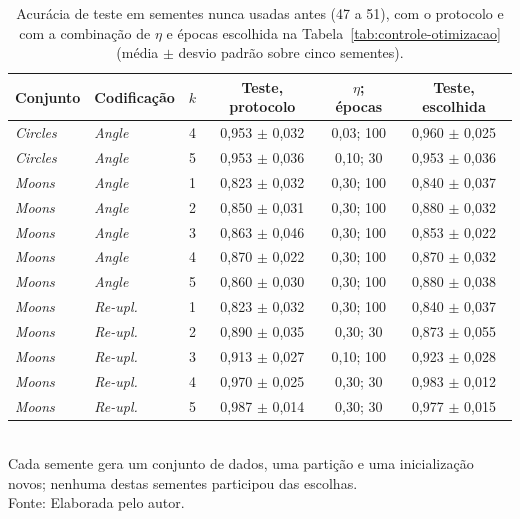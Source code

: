 \begin{table}[htb]
\centering
\small
\caption[Avaliação em sementes novas]{Acurácia de teste em sementes nunca usadas antes (47 a 51), com o protocolo e com a combinação de $\eta$ e épocas escolhida na Tabela~\ref{tab:controle-otimizacao} (média $\pm$ desvio padrão sobre cinco sementes).}
\label{tab:sementes-novas}
\begin{tabular}{llcccc}
\toprule
Conjunto & Codificação & $k$ & Teste, protocolo & $\eta$; épocas & Teste, escolhida \\
\midrule
\textit{Circles} & \textit{Angle} & 4 & 0,953 $\pm$ 0,032 & 0,03; 100 & 0,960 $\pm$ 0,025 \\
\textit{Circles} & \textit{Angle} & 5 & 0,953 $\pm$ 0,036 & 0,10; 30 & 0,953 $\pm$ 0,036 \\
\midrule
\textit{Moons} & \textit{Angle} & 1 & 0,823 $\pm$ 0,032 & 0,30; 100 & 0,840 $\pm$ 0,037 \\
\textit{Moons} & \textit{Angle} & 2 & 0,850 $\pm$ 0,031 & 0,30; 100 & 0,880 $\pm$ 0,032 \\
\textit{Moons} & \textit{Angle} & 3 & 0,863 $\pm$ 0,046 & 0,30; 100 & 0,853 $\pm$ 0,022 \\
\textit{Moons} & \textit{Angle} & 4 & 0,870 $\pm$ 0,022 & 0,30; 100 & 0,870 $\pm$ 0,032 \\
\textit{Moons} & \textit{Angle} & 5 & 0,860 $\pm$ 0,030 & 0,30; 100 & 0,880 $\pm$ 0,038 \\
\textit{Moons} & \textit{Re-upl.} & 1 & 0,823 $\pm$ 0,032 & 0,30; 100 & 0,840 $\pm$ 0,037 \\
\textit{Moons} & \textit{Re-upl.} & 2 & 0,890 $\pm$ 0,035 & 0,30; 30 & 0,873 $\pm$ 0,055 \\
\textit{Moons} & \textit{Re-upl.} & 3 & 0,913 $\pm$ 0,027 & 0,10; 100 & 0,923 $\pm$ 0,028 \\
\textit{Moons} & \textit{Re-upl.} & 4 & 0,970 $\pm$ 0,025 & 0,30; 30 & 0,983 $\pm$ 0,012 \\
\textit{Moons} & \textit{Re-upl.} & 5 & 0,987 $\pm$ 0,014 & 0,30; 30 & 0,977 $\pm$ 0,015 \\
\bottomrule
\end{tabular}
\\[2pt]
{\footnotesize Cada semente gera um conjunto de dados, uma partição e uma inicialização novos; nenhuma destas sementes participou das escolhas.}
\\[2pt]
{\footnotesize Fonte: Elaborada pelo autor.}
\end{table}
